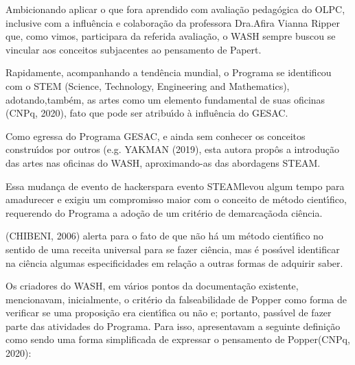 \documentclass[
12pt,		%
openright,	%
twoside,  %
a4paper,			%
chapter=TITLE,		%
english,			%
french,				%
spanish,			%
brazil				%
]{USPSC-classe/USPSC}
\begin{document}
Ambicionando aplicar o que fora aprendido com avalia\c{c}\~ao pedag\'ogica do OLPC, inclusive com a influ\^encia e colabora\c{c}\~ao da professora Dra.Afira Vianna Ripper que, como vimos, participara da referida avalia\c{c}\~ao, o WASH sempre buscou se vincular aos conceitos subjacentes ao pensamento de Papert.









Rapidamente, acompanhando a tend\^encia mundial, o Programa se identificou com o STEM (Science, Technology, Engineering and Mathematics), adotando,tamb\'em, as artes como um elemento fundamental de suas oficinas  (CNPq, 2020), fato que pode ser atribu\'{\i}do \`a influ\^encia do GESAC.









Como egressa do Programa GESAC, e ainda sem conhecer os conceitos constru\'{\i}dos por outros (e.g. YAKMAN (2019), esta autora prop\^os a introdu\c{c}\~ao das artes nas oficinas do WASH, aproximando-as das abordagens STEAM.









Essa mudan\c{c}a de \textquotedbl evento de hackers\textquotedbl  para \textquotedbl evento STEAM\textquotedbl  levou algum tempo para amadurecer e exigiu um compromisso maior com o conceito de m\'etodo cient\'{\i}fico, requerendo do Programa a ado\c{c}\~ao de um \textquotedbl crit\'erio de demarca\c{c}\~ao\textquotedbl  da ci\^encia.









(CHIBENI, 2006) alerta para o fato de que \textquotedbl n\~ao h\'a um m\'etodo cient\'{\i}fico no sentido de uma receita universal para se fazer ci\^encia\textquotedbl , mas \'e poss\'{\i}vel identificar na ci\^encia algumas especificidades em rela\c{c}\~ao a outras formas de adquirir saber.









Os criadores do WASH, em v\'arios pontos da documenta\c{c}\~ao existente, mencionavam, inicialmente, o crit\'erio da falseabilidade de Popper como forma de verificar se uma proposi\c{c}\~ao era cient\'{\i}fica ou n\~ao e; portanto, pass\'{\i}vel de fazer parte das atividades do Programa. Para isso, apresentavam a seguinte defini\c{c}\~ao como sendo uma \textquotedbl forma simplificada de expressar o pensamento de Popper\textquotedbl  (CNPq, 2020):
\end{document}
